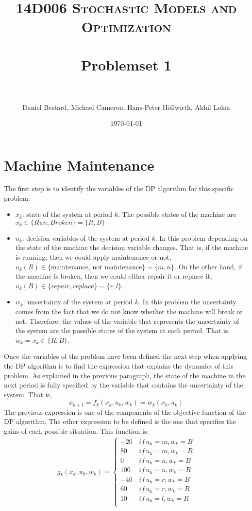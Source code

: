 \documentclass[11pt, oneside]{article}   	%
\title{
\normalfont \normalsize
\textsc{14D006 Stochastic Models and Optimization} \\ [25pt] %
\horrule{0.5pt} \\[0.4cm] %
\huge Problemset 1\\ %
\horrule{2pt} \\[0.5cm] %
}
\author{Daniel Bestard, Michael Cameron, Hans-Peter H{\"o}llwirth, Akhil Lohia} %
\date{\normalsize\today} %
\begin{document}
\maketitle


\section{Machine Maintenance}
The first step is to identify the variables of the DP algorithm for this specific problem:
\begin{itemize}
	\item $x_{k}$: state of the system at period $k$. The possible states of the machine are $x_{k} \in \{Run, Broken\} = \{R,B\}$
	\item $u_{k}$: decision variables of the system at period $k$. In this problem depending on the state of the machine the decision variable changes. That is, if the machine is running, then we could apply maintenance or not, $u_{k}(R) \in \{\text{maintenance, not maintenance}\} = \{m,n\}$. On the other hand, if the machine is broken, then we could either repair it or replace it, $u_{k}(B) \in \{repair, replace\} = \{r,l\}$.
	\item $w_{k}$: uncertainty of the system at period $k$. In this problem the uncertainty comes from the fact that we do not know whether the machine will break or not. Therefore, the values of the variable that represents the uncertainty of the system are the possible states of the system at each period. That is, $w_{k} = x_{k} \in \{R,B\}$.
\end{itemize}
Once the variables of the problem have been defined the next step when applying the DP algorithm is to find the expression that explains the dynamics of this problem. As explained in the previous paragraph, the state of the machine in the next period is fully specified by the variable that contains the uncertainty of the system. That is,
$$x_{k+1} = f_{k}(x_{k},u_{k},w_{k}) = w_{k}(x_{k},u_{k})$$
The previous expression is one of the components of the objective function of the DP algorithm. The other expression to be defined is the one that specifies the gains of each possible situation. This function is:
\begin{align*}
g_{k}(x_{k},u_{k},w_{k}) =
\begin{cases}
	-20  \, & if \, u_{k}=m,w_{k}=B\\
	 80  \, & if \, u_{k}=m,w_{k}=R\\
	 0  \, & if \, u_{k}=n,w_{k}=B\\
	 100  \, & if \, u_{k}=n,w_{k}=R\\
	 -40  \, & if \, u_{k}=r,w_{k}=B\\
	 60  \, & if \, u_{k}=r,w_{k}=R\\
	 10  \, & if \, u_{k}=l,w_{k}=R\\
\end{cases}
\end{align*}
\end{document}
